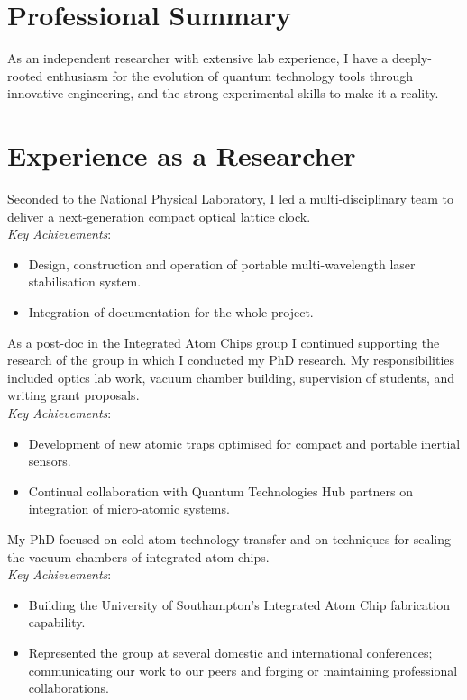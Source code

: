\documentclass[11pt,a4paper,sans]{moderncv}        %
\begin{document}
\makecvtitle
\vspace{-1.5cm}
\section{Professional Summary}
As an independent researcher with extensive lab experience, I have a deeply-rooted enthusiasm for the evolution of quantum technology tools through innovative engineering, and the strong experimental skills to make it a reality.

\section{Experience as a Researcher}
{Seconded to the National Physical Laboratory, I led a multi-disciplinary team to deliver a next-generation compact optical lattice clock.
\\\textit{Key Achievements}:
\begin{itemize}[leftmargin=1cm]
	\item Design, construction and operation of portable multi-wavelength laser stabilisation system.
	\item Integration of documentation for the whole project.
\end{itemize}
}  %

{As a post-doc in the Integrated Atom Chips group I continued supporting the research of the group in which I conducted my PhD research. My responsibilities included optics lab work, vacuum chamber building, supervision of students, and writing grant proposals.
\\\textit{Key Achievements}:
\begin{itemize}[leftmargin=1cm]
	\item Development of new atomic traps optimised for compact and portable inertial sensors.
	\item Continual collaboration with Quantum Technologies Hub partners on integration of micro-atomic systems.
\end{itemize}
} 

{My PhD focused on cold atom technology transfer and on techniques for sealing the vacuum chambers of integrated atom chips.
\\\textit{Key Achievements}:
\begin{itemize}[leftmargin=1cm]
	\item Building the University of Southampton's Integrated Atom Chip fabrication capability.
	\item Represented the group at several domestic and international conferences; communicating our work to our peers and forging or maintaining professional collaborations.
\end{itemize}
}
\end{document}
